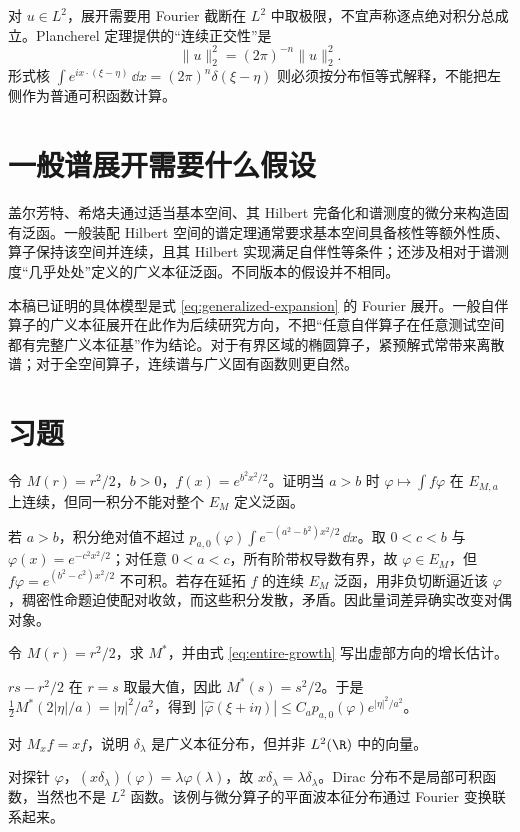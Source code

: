 对 $u\in L^2$，展开需要用 Fourier 截断在 $L^2$ 中取极限，不宜声称逐点绝对积分总成立。Plancherel 定理提供的“连续正交性”是
\[
 \|u\|_2^2=(2\pi)^{-n}\|\widehat u\|_2^2.
\]
形式核 $\int e^{ix\cdot(\xi-\eta)}\,\dd x=(2\pi)^n\delta(\xi-\eta)$ 则必须按分布恒等式解释，不能把左侧作为普通可积函数计算。

\section{一般谱展开需要什么假设}
盖尔芳特、希烙夫通过适当基本空间、其 Hilbert 完备化和谱测度的微分来构造固有泛函。一般装配 Hilbert 空间的谱定理通常要求基本空间具备核性等额外性质、算子保持该空间并连续，且其 Hilbert 实现满足自伴性等条件；还涉及相对于谱测度“几乎处处”定义的广义本征泛函。不同版本的假设并不相同。

本稿已证明的具体模型是式 \eqref{eq:generalized-expansion} 的 Fourier 展开。一般自伴算子的广义本征展开在此作为后续研究方向，不把“任意自伴算子在任意测试空间都有完整广义本征基”作为结论。对于有界区域的椭圆算子，紧预解式常带来离散谱；对于全空间算子，连续谱与广义固有函数则更自然。

\section{习题}
\begin{exercise}[固定层可积不等于在并空间可积]
令 $M(r)=r^2/2$，$b>0$，$f(x)=e^{b^2x^2/2}$。证明当 $a>b$ 时 $\varphi\mapsto\int f\varphi$ 在 $E_{M,a}$ 上连续，但同一积分不能对整个 $E_M$ 定义泛函。
\end{exercise}
\begin{solution}
若 $a>b$，积分绝对值不超过 $p_{a,0}(\varphi)\int e^{-(a^2-b^2)x^2/2}\,\dd x$。取 $0<c<b$ 与 $\varphi(x)=e^{-c^2x^2/2}$；对任意 $0<a<c$，所有阶带权导数有界，故 $\varphi\in E_M$，但 $f\varphi=e^{(b^2-c^2)x^2/2}$ 不可积。若存在延拓 $f$ 的连续 $E_M$ 泛函，用非负切断逼近该 $\varphi$，稠密性命题迫使配对收敛，而这些积分发散，矛盾。因此量词差异确实改变对偶对象。
\end{solution}
\begin{exercise}
令 $M(r)=r^2/2$，求 $M^*$，并由式 \eqref{eq:entire-growth} 写出虚部方向的增长估计。
\end{exercise}
\begin{solution}
$rs-r^2/2$ 在 $r=s$ 取最大值，因此 $M^*(s)=s^2/2$。于是 $\frac12M^*(2|\eta|/a)=|\eta|^2/a^2$，得到 $|\widehat\varphi(\xi+i\eta)|\le C_a p_{a,0}(\varphi)e^{|\eta|^2/a^2}$。
\end{solution}
\begin{exercise}[乘法算子的广义本征向量]
对 $M_xf=xf$，说明 $\delta_\lambda$ 是广义本征分布，但并非 $L^2(\R)$ 中的向量。
\end{exercise}
\begin{solution}
对探针 $\varphi$，$(x\delta_\lambda)(\varphi)=\lambda\varphi(\lambda)$，故 $x\delta_\lambda=\lambda\delta_\lambda$。Dirac 分布不是局部可积函数，当然也不是 $L^2$ 函数。该例与微分算子的平面波本征分布通过 Fourier 变换联系起来。
\end{solution}
